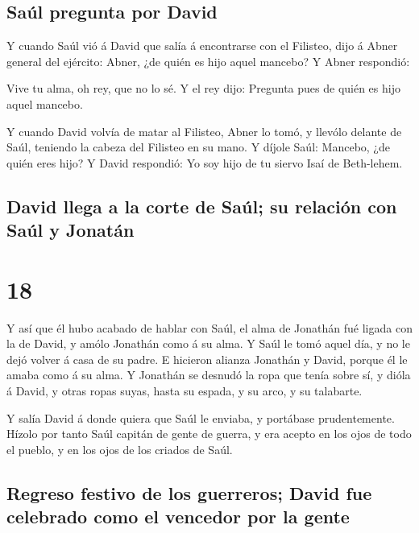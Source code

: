 \hypertarget{sauxfal-pregunta-por-david}{%
\subsection{Saúl pregunta por David}\label{sauxfal-pregunta-por-david}}

 Y cuando Saúl vió á David que salía á encontrarse con el
Filisteo, dijo á Abner general del ejército: Abner, ¿de quién es hijo
aquel mancebo? Y Abner respondió:

 Vive tu alma, oh rey, que no lo sé. Y el rey dijo:
Pregunta pues de quién es hijo aquel mancebo.

 Y cuando David volvía de matar al Filisteo, Abner lo tomó,
y llevólo delante de Saúl, teniendo la cabeza del Filisteo en su mano.
 Y díjole Saúl: Mancebo, ¿de quién eres hijo? Y David
respondió: Yo soy hijo de tu siervo Isaí de Beth-lehem.

\hypertarget{david-llega-a-la-corte-de-sauxfal-su-relaciuxf3n-con-sauxfal-y-jonatuxe1n}{%
\subsection{David llega a la corte de Saúl; su relación con Saúl y
Jonatán}\label{david-llega-a-la-corte-de-sauxfal-su-relaciuxf3n-con-sauxfal-y-jonatuxe1n}}

\hypertarget{section-17}{%
\section{18}\label{section-17}}

 Y así que él hubo acabado de hablar con Saúl, el alma de
Jonathán fué ligada con la de David, y amólo Jonathán como á su alma.
 Y Saúl le tomó aquel día, y no le dejó volver á casa de su
padre.  E hicieron alianza Jonathán y David, porque él le
amaba como á su alma.  Y Jonathán se desnudó la ropa que
tenía sobre sí, y dióla á David, y otras ropas suyas, hasta su espada, y
su arco, y su talabarte.

 Y salía David á donde quiera que Saúl le enviaba, y
portábase prudentemente. Hízolo por tanto Saúl capitán de gente de
guerra, y era acepto en los ojos de todo el pueblo, y en los ojos de los
criados de Saúl.

\hypertarget{regreso-festivo-de-los-guerreros-david-fue-celebrado-como-el-vencedor-por-la-gente}{%
\subsection{Regreso festivo de los guerreros; David fue celebrado como
el vencedor por la
gente}\label{regreso-festivo-de-los-guerreros-david-fue-celebrado-como-el-vencedor-por-la-gente}}

